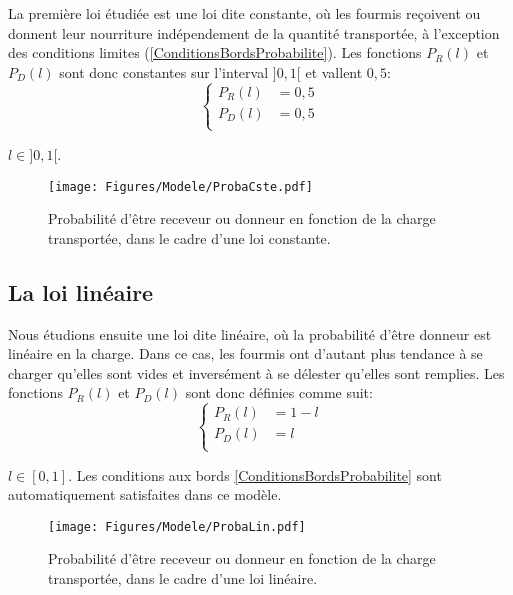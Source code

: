 La première loi étudiée est une loi dite constante, où les fourmis reçoivent ou donnent leur nourriture indépendement de la quantité transportée, à l'exception des conditions limites (\ref{ConditionsBordsProbabilite}). Les fonctions $P_R(l)$ et $P_D(l)$ sont donc constantes sur l'interval $]0,1[$ et vallent $0,5$:\\

\begin{equation}
\left \{
\begin{aligned}
P_R (l) &= 0,5\\
P_D (l) &= 0,5\\
\end{aligned}
\right.
\label{PRCste}
\end{equation}

$l\in]0,1[$.

\begin{figure}[h]
\centering
\texttt{[image: Figures/Modele/ProbaCste.pdf]}
\caption{Probabilité d'être receveur ou donneur en fonction de la charge transportée, dans le cadre d'une loi constante.}
\label{ProbaCste}
\end{figure}

\subsection{La loi linéaire}
Nous étudions ensuite une loi dite linéaire, où la probabilité d'être donneur est linéaire en la charge. Dans ce cas, les fourmis ont d'autant plus tendance à se charger qu'elles sont vides et inversément à se délester qu'elles sont remplies. Les fonctions $P_R(l)$ et $P_D(l)$ sont donc définies comme suit:
\begin{equation}
\left \{
\begin{aligned}
P_R (l) &= 1-l\\
P_D (l) &= l\\
\end{aligned}
\right.
\label{PRLin}
\end{equation}

$l\in[0,1]$. Les conditions aux bords \ref{ConditionsBordsProbabilite} sont automatiquement satisfaites dans ce modèle.

\begin{figure}[h]
\centering
\texttt{[image: Figures/Modele/ProbaLin.pdf]}
\caption{Probabilité d'être receveur ou donneur en fonction de la charge transportée, dans le cadre d'une loi linéaire.}
\label{ProbaLin}
\end{figure}


